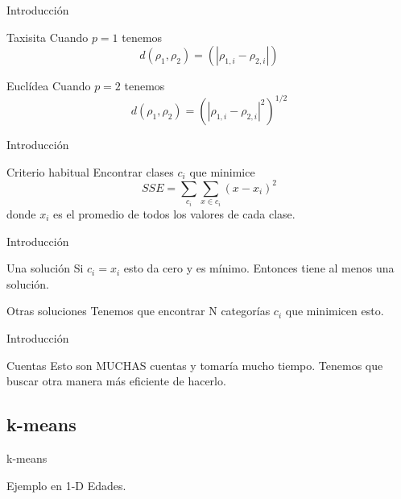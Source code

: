 \documentclass[handout]{beamer}
\begin{document}
\begin{frame}{Introducción}
  \begin{exampleblock}{Taxisita}
    Cuando $p=1$ tenemos
    \begin{equation}
      d(\rho_1, \rho_2) = \left( | \rho_{1,i} - \rho_{2,i} | \right)
    \end{equation}
  \end{exampleblock}\pause
  \begin{exampleblock}{Euclídea}
    Cuando $p=2$ tenemos
    \begin{equation}
      d(\rho_1, \rho_2) = \left( | \rho_{1,i} - \rho_{2,i} |^2 \right)^{1/2}
    \end{equation}
  \end{exampleblock}
\end{frame}

\begin{frame}{Introducción}
  \begin{block}{Criterio habitual}
    Encontrar clases $c_i$ que minimice
      \begin{equation}
          SSE = \sum_{c_i} \sum_{x \in c_i} (x-x_i)^2
      \end{equation}
       donde $x_i$ es el promedio de todos los valores de cada clase.
  \end{block}
\end{frame}

\begin{frame}{Introducción}
  \begin{exampleblock}{Una solución}
    Si $c_i = {x_i}$ esto da cero y es mínimo. Entonces tiene al menos una solución.
  \end{exampleblock}\pause
  \begin{block}{Otras soluciones}
    Tenemos que encontrar N categorías $c_i$ que minimicen esto.
  \end{block}
\end{frame}

\begin{frame}{Introducción}
  \begin{block}{Cuentas}
    Esto son MUCHAS cuentas y tomaría mucho tiempo. \pause Tenemos que buscar otra manera más eficiente de hacerlo.
  \end{block}
\end{frame}

\subsection{k-means}
\begin{frame}{k-means}
  \begin{exampleblock}{Ejemplo en 1-D}
    Edades.
  \end{exampleblock}
\end{frame}
\end{document}
